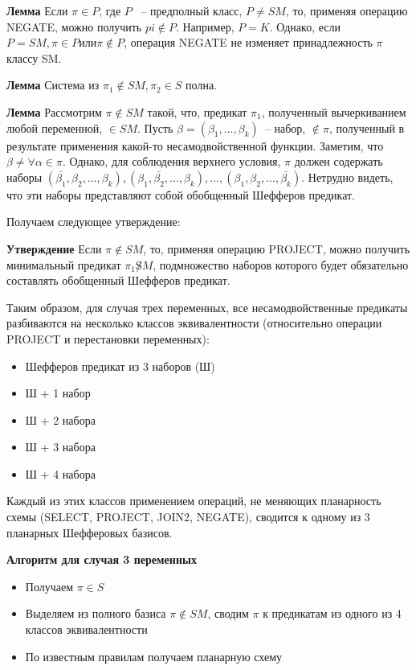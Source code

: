 \documentclass[12pt]{article}
\begin{document}

\textbf{Лемма} Если $\pi \in P$, где $P$ ~-- предполный класс, $P \neq SM$, то, применяя операцию NEGATE,
можно получить $pi \notin P$. Например, $P = K$.
Однако, если $P = SM, \pi \in P или \pi \notin P$, операция NEGATE не изменяет принадлежность $\pi$ классу SM.

\textbf{Лемма} Система из $\pi_1 \notin SM, \pi_2 \in S$ полна.

\label{lemma_sm}
\textbf{Лемма} Рассмотрим $\pi \notin SM$ такой, что, предикат $\pi_1$, полученный вычеркиванием любой переменной, $\in SM$.
Пусть $\beta = (\beta_1, \dots, \beta_k)$~-- набор, $\notin \pi$, полученный в результате применения какой-то несамодвойственной функции.
Заметим, что $\beta \neq \forall \alpha \in \pi$. Однако, для соблюдения верхнего условия, $\pi$ должен содержать наборы 
$(\bar{\beta_1}, \beta_2, \dots, \beta_k), (\beta_1, \bar{\beta_2}, \dots, \beta_k), \dots, (\beta_1, \beta_2, \dots, \bar{\beta_k})$.
Нетрудно видеть, что эти наборы представляют собой обобщенный Шефферов предикат. 

Получаем следующее утверждение: 

\textbf{Утверждение} Если $\pi \notin SM$, то, применяя операцию PROJECT, можно получить минимальный предикат $\pi_1 \not SM$, 
подмножество наборов которого будет обязательно составлять обобщенный Шефферов предикат.

Таким образом, для случая трех переменных, все несамодвойственные предикаты разбиваются на несколько классов эквивалентности 
(относительно операции PROJECT и перестановки переменных): 
\begin{itemize}
\item{Шефферов предикат из 3 наборов (Ш)}
\item{Ш + 1 набор}
\item{Ш + 2 набора}
\item{Ш + 3 набора}
\item{Ш + 4 набора}
\end{itemize}

Каждый из этих классов применением операций, не меняющих планарность схемы (SELECT, PROJECT, JOIN2, NEGATE), сводится к одному из 3
планарных Шефферовых базисов.

\textbf{Алгоритм для случая 3 переменных}
\begin{itemize}
\item{Получаем $\pi \in S$}
\item{Выделяем из полного базиса $\pi \notin SM$, сводим $\pi$ к предикатам из одного из 4 классов эквивалентности}
\item{По известным правилам получаем планарную схему}
\end{itemize}
\end{document}
